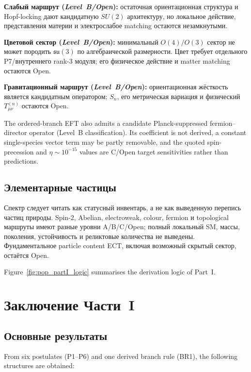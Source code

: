\documentclass[11pt,a4paper]{article}
\begin{document}
\textbf{Слабый маршрут (\emph{Level~B/Open}):} остаточная ориентационная структура и Hopf-locking дают кандидатную $SU(2)$ архитектуру, но локальное действие, представления материи и электрослабое matching остаются незамкнутыми.

\textbf{Цветовой сектор (\emph{Level~B/Open}):} минимальный $O(4)/O(3)$ сектор не может породить $\mathfrak{su}(3)$ по алгебраической размерности. Цвет требует отдельного P7/внутреннего rank-3 модуля; его физическое действие и matter matching остаются Open.

\textbf{Гравитационный маршрут (\emph{Level~B/Open}):} ориентационная жёсткость является кандидатным оператором; $S_n$, его метрическая вариация и физический $T^{(n)}_{\mu\nu}$ остаются Open.

The ordered-branch EFT also admits a candidate Planck-suppressed fermion--director operator (Level~B classification).  Its coefficient is not derived, a constant single-species vector term may be partly removable, and the quoted spin-precession and $\eta\sim10^{-15}$ values are C/Open target sensitivities rather than predictions.

\subsection{Элементарные частицы}

Спектр следует читать как статусный инвентарь, а не как выведенную перепись частиц природы. Spin-2, Abelian, electroweak, colour, fermion и topological маршруты имеют разные уровни A/B/C/Open; полный локальный SM, массы, поколения, устойчивость и реликтовые количества не выведены. Фундаментальное particle content ECT, включая возможный скрытый сектор, остаётся Open.

Figure~\ref{fig:pop_partI_logic} summarises the derivation logic of Part~I.


\section{Заключение Части~I}

\subsection{Основные результаты}

From six postulates (P1--P6) and one derived branch rule (BR1), the following structures are obtained:
\end{document}
